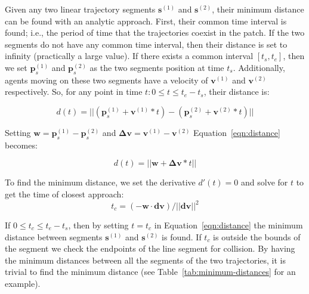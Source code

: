 Given any two linear trajectory segments $\mathbf{s}^{(1)}$ and $\mathbf{s}^{(2)}$, their minimum distance can be found with an analytic approach.
First, their common time interval is found; i.e., the period of time that the trajectories coexist in the patch.
If the two segments do not have any common time interval, then their distance is set to infinity (practically a large value).
If there exists a common interval $[t_{s}, t_{e}]$, then we set $\mathbf{p}_s^{(1)}$ and $\mathbf{p}_s^{(2)}$
as the two segments position at time $t_s$.
Additionally, agents moving on these two segments have a velocity of $\mathbf{v}^{(1)}$ and $\mathbf{v}^{(2)}$ respectively.
So, for any point in time $t: 0 \le t \le t_e - t_s$, their distance is:

\begin{equation}
	d(t) = || (\mathbf{p}_s^{(1)}+\mathbf{v}^{(1)} * t) -
				(\mathbf{p}_s^{(2)}+\mathbf{v}^{(2)} * t) ||
	\label{eqn:distance}
\end{equation}

Setting $ \mathbf{w} = \mathbf{p}_s^{(1)} - \mathbf{p}_s^{(2)}$ and $\mathbf{\Delta{v}} = \mathbf{v}^{(1)} - \mathbf{v}^{(2)}$ Equation~\ref{eqn:distance} becomes:

\begin{equation}
	d(t) = || \mathbf{w} + \mathbf{\Delta{v}}*t ||
	\label{eqn:distance_simple}
\end{equation}

To find the minimum distance, we set the derivative  $d'(t) = 0$ and solve for $t$ to get the time of closest approach:
\begin{equation}
	t_c = (-\mathbf{w} \cdot \mathbf{dv}) / || \mathbf{dv} || ^ 2
	\label{eqn:distance_time}
\end{equation}

If $0 \le t_c \le t_e - t_s$, then by setting $t = t_c$ in Equation~\ref{eqn:distance} the minimum distance between segments $\mathbf{s}^{(1)}$ and $\mathbf{s}^{(2)}$ is found.
If $t_c$ is outside the bounds of the segment we check the endpoints of the line segment for collision.
By having the minimum distances between all the segments of the two trajectories, it is trivial to find the minimum distance (see Table~\ref{tab:minimum-distances} for an example).


